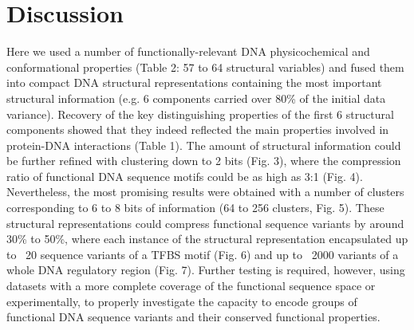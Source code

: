 \documentclass[sigconf]{acmart}
\begin{document}
\section{Discussion}
Here we used a number of functionally-relevant DNA physicochemical and conformational properties (Table 2: 57 to 64 structural variables) and fused them into compact DNA structural representations containing the most important structural information (e.g. 6 components carried over 80\% of the initial data variance). Recovery of the key distinguishing properties of the first 6 structural components showed that they indeed reflected the main properties involved in protein-DNA interactions (Table 1). The amount of structural information could be further refined with clustering down to 2 bits (Fig. 3), where the compression ratio of functional DNA sequence motifs could be as high as 3:1 (Fig. 4). Nevertheless, the most promising results were obtained with a number of clusters corresponding to 6 to 8 bits of information (64 to 256 clusters, Fig. 5). These structural representations could compress functional sequence variants by around 30\% to 50\%, where each instance of the structural representation encapsulated up to ~20 sequence variants of a TFBS motif (Fig. 6) and up to ~2000 variants of a whole DNA regulatory region (Fig. 7). Further testing is required, however, using datasets with a more complete coverage of the functional sequence space or experimentally, to properly investigate the capacity to encode groups of functional DNA sequence variants and their conserved functional properties. 
\end{document}
